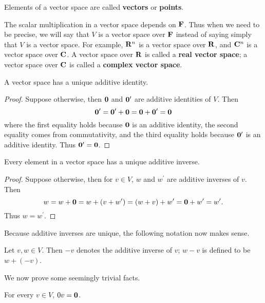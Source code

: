 Elements of a vector space are called \textbf{vectors} or \textbf{points}.

The scalar multiplication in a vector space depends on $\mathbf F$. Thus when we
need to be precise, we will say that $V$ is a vector space over $\mathbf F$ instead of saying simply that $V$ is a vector space. For example, $\mathbf R^n$ is a vector space over $\mathbf R$, and $\mathbf C^n$ is a vector space over $\mathbf C$. A vector space over $\mathbf R$ is called a \textbf{real vector space}; a vector space over $\mathbf C$ is called a \textbf{complex vector space}.

\begin{proposition}
A vector space has a unique additive identity.
\end{proposition}

\begin{proof}
Suppose otherwise, then $\vb{0}$ and $\vb{0}^\prime$ are additive identities of $V$. Then
\[\vb{0}^\prime=\vb{0}^\prime+\vb{0}=\vb{0}+\vb{0}^\prime=\vb{0}\]
where the first equality holds because $\vb{0}$ is an additive identity, the second equality comes from commutativity, and the third equality holds because $\vb{0}^\prime$ is an additive identity. Thus $\vb{0}^\prime=\vb{0}$.
\end{proof}

\begin{proposition}
Every element in a vector space has a unique additive inverse.
\end{proposition}

\begin{proof}
Suppose otherwise, then for $v\in V$, $w$ and $w^\prime$ are additive inverses of $v$. Then
\[w=w+\vb{0}=w+(v+w^\prime)=(w+v)+w^\prime=\vb{0}+w^\prime=w^\prime.\]
Thus $w=w^\prime$.
\end{proof}

Because additive inverses are unique, the following notation now makes sense.

\begin{notation}
Let $v,w\in V$. Then $-v$ denotes the additive inverse of $v$; $w-v$ is defined to be $w+(-v)$.
\end{notation}

We now prove some seemingly trivial facts.

\begin{proposition}
For every $v\in V$, $0v=\vb{0}$.
\end{proposition}

